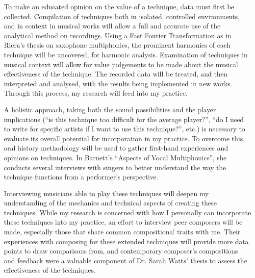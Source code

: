 To make an educated opinion on the value of a technique, data must first be collected. 
Compilation of techniques both in isolated, controlled environments, and in context in musical works will allow a full and accurate use of the analytical method on recordings. 
Using a Fast Fourier Transformation as in Riera’s thesis on saxophone multiphonics, the prominent harmonics of each technique will be uncovered, for harmonic analysis.\autocite{rieraComparativeStudySaxophone2014} 
Examination of techniques in musical context will allow for value judgements to be made about the musical effectiveness of the technique. 
The recorded data will be treated, and then interpreted and analysed, with the results being implemented in new works.\autocite{torresMultiphonicsCompositionalElement2012} 
Through this process, my research will feed into my practice.

A holistic approach, taking both the sound possibilities and the player implications (“is this technique too difficult for the average player?”, “do I need to write for specific artists if I want to use this technique?”, etc.) is necessary to evaluate its overall potential for incorporation in my practice. 
To overcome this, oral history methodology will be used to gather first-hand experiences and opinions on techniques. 
In Barnett’s “Aspects of Vocal Multiphonics”, she conducts several interviews with singers to better understand the way the technique functions from a performer’s perspective.\autocite{barnettAspectsVocalMultiphonics1977} 

Interviewing musicians able to play these techniques will deepen my understanding of the mechanics and technical aspects of creating these techniques. 
While my research is concerned with how I personally can incorporate these techniques into my practice, an effort to interview peer composers will be made, especially those that share common compositional traits with me. 
Their experiences with composing for these extended techniques will provide more data points to draw comparisons from, and contemporary composer’s compositions and feedback were a valuable component of Dr. Sarah Watts’ thesis to assess the effectiveness of the techniques.


